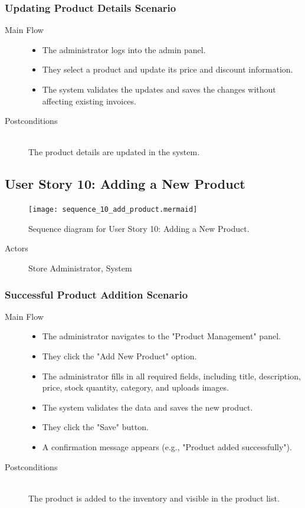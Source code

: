 \documentclass[twoside,a4paper,journal]{IEEEtran}
\begin{document}
\subsubsection{Updating Product Details Scenario}
\begin{description}
  \item[Main Flow] \hfill
    \begin{itemize}
      \item The administrator logs into the admin panel.
      \item They select a product and update its price and discount information.
      \item The system validates the updates and saves the changes without
        affecting existing invoices.
    \end{itemize}
  \item[Postconditions] \hfill \\ The product details are updated in the system.
\end{description}

\subsection{User Story 10: Adding a New Product}
\begin{figure}[!t]
\centering
\texttt{[image: sequence\_10\_add\_product.mermaid]}
\caption{Sequence diagram for User Story 10: Adding a New Product.}
\label{fig:sequence_10}
\end{figure}
\begin{description}
  \item[Actors] Store Administrator, System
\end{description}
\subsubsection{Successful Product Addition Scenario}
\begin{description}
  \item[Main Flow] \hfill
    \begin{itemize}
      \item The administrator navigates to the "Product Management" panel.
      \item They click the "Add New Product" option.
      \item The administrator fills in all required fields, including title,
        description, price, stock quantity, category, and uploads images.
      \item The system validates the data and saves the new product.
      \item They click the "Save" button.
      \item A confirmation message appears (e.g., "Product added successfully").
    \end{itemize}
  \item[Postconditions] \hfill \\
    The product is added to the inventory and visible in the product list.
\end{description}
\end{document}
